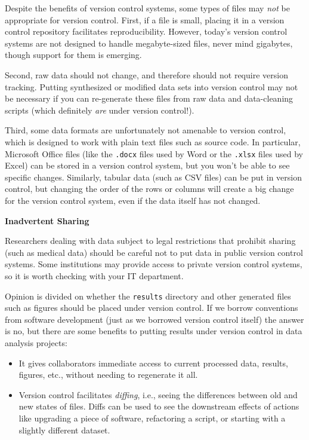 \documentclass[10pt]{article}
\begin{document}
Despite the benefits of version control systems, some types of files
may \emph{not} be appropriate for version control. First, if a file is
small, placing it in a version control repository facilitates
reproducibility. However, today's version control systems are not
designed to handle megabyte-sized files, never mind gigabytes, though
support for them is emerging.

Second, raw data should not change, and therefore should not require
version tracking. Putting synthesized or modified data sets into
version control may not be necessary if you can re-generate these
files from raw data and data-cleaning scripts (which definitely
\emph{are} under version control!).

Third, some data formats are unfortunately not amenable to version
control, which is designed to work with plain text files such as
source code.  In particular, Microsoft Office files (like the
\texttt{.docx} files used by Word or the \texttt{.xlsx} files used by
Excel) can be stored in a version control system, but you won't be
able to see specific changes. Similarly, tabular data (such as CSV
files) can be put in version control, but changing the order of the
rows or columns will create a big change for the version control
system, even if the data itself has not changed.

\begin{framed}
  \noindent \textbf{Inadvertent Sharing}

  Researchers dealing with data subject to legal restrictions that
  prohibit sharing (such as medical data) should be careful not to put
  data in public version control systems. Some institutions may provide
  access to private version control systems, so it is worth checking with
  your IT department.
\end{framed}

Opinion is divided on whether the \texttt{results} directory and other
generated files such as figures should be placed under version
control. If we borrow conventions from software development (just as
we borrowed version control itself) the answer is no, but there are
some benefits to putting results under version control in data
analysis projects:

\begin{itemize}
\item
  It gives collaborators immediate access to current processed data,
  results, figures, etc., without needing to regenerate it all.
\item
  Version control facilitates \emph{diffing}, i.e., seeing the
  differences between old and new states of files. Diffs can be used to
  see the downstream effects of actions like upgrading a piece of
  software, refactoring a script, or starting with a slightly different
  dataset.
\end{itemize}
\end{document}
